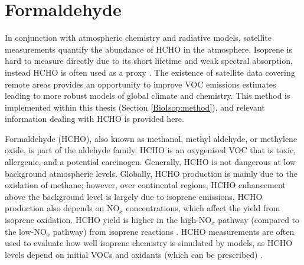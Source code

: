     
    
\section{Formaldehyde}
\label{LR:HCHO}

  In conjunction with atmospheric chemistry and radiative models, satellite measurements quantify the abundance of HCHO in the atmosphere.
  Isoprene is hard to measure directly due to its short lifetime and weak spectral absorption, instead HCHO is often used as a proxy \parencite{Millet2006, Fu2007, Dufour2009, Marais2012, bauwens2013satellite, Kefauver2014, Bauwens2016, Surl2018}.
  The existence of satellite data covering remote areas provides an opportunity to improve VOC emissions estimates leading to more robust models of global climate and chemistry. 
  This method is implemented within this thesis (Section \ref{BioIsop:method}), and relevant information dealing with HCHO is provided here.
  
  
  Formaldehyde (HCHO), also known as methanal, methyl aldehyde, or methylene oxide, is part of the aldehyde family.
  HCHO is an oxygenised VOC that is toxic, allergenic, and a potential carcinogen.
  Generally, HCHO is not dangerous at low background atmospheric levels.
  Globally, HCHO production is mainly due to the oxidation of methane; however, over continental regions, HCHO enhancement above the background level is largely due to isoprene emissions.
  HCHO production also depends on NO$_x$ concentrations, which affect the yield from isoprene oxidation.
  HCHO yield is higher in the high-NO$_x$ pathway (compared to the low-NO$_x$ pathway) from isoprene reactions \parencite{Marais2012}.
  HCHO measurements are often used to evaluate how well isoprene chemistry is simulated by models, as HCHO levels depend on initial VOCs and oxidants (which can be prescribed) \parencite{Marvin2017}.
  
